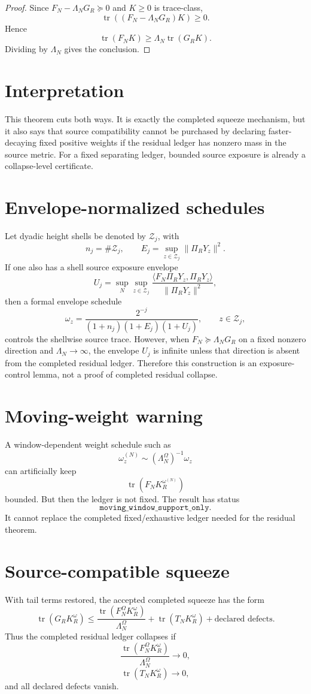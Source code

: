 \documentclass[11pt]{article}
\begin{document}
\begin{proof}
Since $F_N-\Lambda_NG_R\succeq0$ and $K\ge0$ is trace-class,
\[
  \operatorname{tr}((F_N-\Lambda_NG_R)K)\ge0.
\]
Hence
\[
  \operatorname{tr}(F_NK)\ge\Lambda_N\operatorname{tr}(G_RK).
\]
Dividing by $\Lambda_N$ gives the conclusion.
\end{proof}

\section{Interpretation}
This theorem cuts both ways. It is exactly the completed squeeze mechanism, but it also says that source compatibility cannot be purchased by declaring faster-decaying fixed positive weights if the residual ledger has nonzero mass in the source metric. For a fixed separating ledger, bounded source exposure is already a collapse-level certificate.

\section{Envelope-normalized schedules}
Let dyadic height shells be denoted by $\mathcal Z_j$, with
\[
  n_j=\#\mathcal Z_j,
  \qquad
  E_j=\sup_{z\in\mathcal Z_j}\|\Pi_RY_z\|^2.
\]
If one also has a shell source exposure envelope
\[
  U_j=\sup_N\sup_{z\in\mathcal Z_j}
  \frac{\langle F_N\Pi_RY_z,\Pi_RY_z\rangle}{\|\Pi_RY_z\|^2},
\]
then a formal envelope schedule
\[
  \omega_z=\frac{2^{-j}}{(1+n_j)(1+E_j)(1+U_j)},
  \qquad z\in\mathcal Z_j,
\]
controls the shellwise source trace. However, when $F_N\succeq\Lambda_NG_R$ on a fixed nonzero direction and $\Lambda_N\to\infty$, the envelope $U_j$ is infinite unless that direction is absent from the completed residual ledger. Therefore this construction is an exposure-control lemma, not a proof of completed residual collapse.

\section{Moving-weight warning}
A window-dependent weight schedule such as
\[
  \omega_z^{(N)}\sim (\Lambda_N^\Omega)^{-1}\omega_z
\]
can artificially keep
\[
  \operatorname{tr}(F_NK_R^{\omega^{(N)}})
\]
bounded. But then the ledger is not fixed. The result has status
\[
  \texttt{moving\_window\_support\_only}.
\]
It cannot replace the completed fixed/exhaustive ledger needed for the residual theorem.

\section{Source-compatible squeeze}
With tail terms restored, the accepted completed squeeze has the form
\[
  \operatorname{tr}(G_RK_R^\omega)
  \le
  \frac{\operatorname{tr}(F_N^\Omega K_R^\omega)}{\Lambda_N^\Omega}
  +\operatorname{tr}(T_NK_R^\omega)
  +\text{declared defects}.
\]
Thus the completed residual ledger collapses if
\[
  \frac{\operatorname{tr}(F_N^\Omega K_R^\omega)}{\Lambda_N^\Omega}\to0,
\]
\[
  \operatorname{tr}(T_NK_R^\omega)\to0,
\]
and all declared defects vanish.
\end{document}

